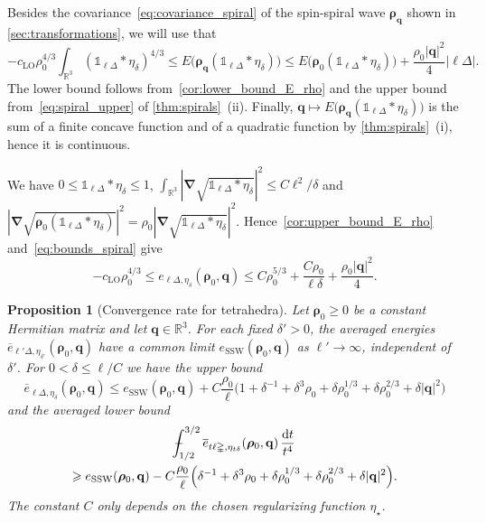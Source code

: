 \documentclass[final,reqno]{amsart}
\newtheorem{proposition}[theorem]{Proposition}
\theoremstyle{remark}
\renewcommand{\le}{\leqslant}
\renewcommand{\ge}{\geqslant}
\newcommand{\ol}[1]{\overline{#1}}
\newcommand{\RR}{\mathbb{R}}
\newcommand{\LO}{\mathrm{LO}}
\newcommand{\SSW}{\mathrm{SSW}}
\newcommand{\iden}{\mathbb{1}}
\newcommand{\grad}{\bm{\nabla}}
\newcommand{\tetra}{\mathbb{\Delta}}
\newcommand{\dd}{\mathrm{d}}
\def\Xint#1{\mathchoice
{\XXint\displaystyle\textstyle{#1}}
{\XXint\textstyle\scriptstyle{#1}}
{\XXint\scriptstyle\scriptscriptstyle{#1}}
{\XXint\scriptscriptstyle\scriptscriptstyle{#1}}
\!\int}
\def\XXint#1#2#3{{\setbox0=\hbox{$#1{#2#3}{\int}$ }
\vcenter{\hbox{$#2#3$ }}\kern-.6\wd0}}
\def\dashint{\Xint-}
\begin{document}
Besides the covariance~\cref{eq:covariance_spiral} of the spin-spiral wave $\bm{\rho}_{\mathbf{q}}$ shown in \cref{sec:transformations}, we will use that
\begin{equation}\label{eq:bounds_spiral}
-c_\LO\rho_0^{4/3}\int_{\RR^3}(\iden_{\ell\tetra}\ast\eta_\delta)^{4/3}\le E\big(\bm{\rho}_{\mathbf{q}}(\iden_{\ell\tetra}\ast\eta_\delta)\big)\le E\big(\bm{\rho}_0(\iden_{\ell\tetra}\ast\eta_\delta)\big)+\frac{\rho_0|\mathbf{q}|^2}{4}|\ell\tetra|.
\end{equation}
The lower bound follows from~\cref{cor:lower_bound_E_rho} and the upper bound from~\cref{eq:spiral_upper} of \cref{thm:spirals}~(ii). Finally, $\mathbf{q}\mapsto E\big(\bm{\rho}_{\mathbf{q}}(\iden_{\ell\tetra}\ast\eta_\delta)\big)$ is the sum of a finite concave function and of a quadratic function by \cref{thm:spirals}~(i), hence it is continuous.

We have $0\le\iden_{\ell\tetra}\ast\eta_\delta\le1$, $\int_{\RR^3}|\grad\sqrt{\iden_{\ell\tetra}\ast\eta_\delta}|^2\le C\ell^2/\delta$ and $|\grad\sqrt{\bm{\rho}_0(\iden_{\ell\tetra}\ast\eta_\delta)}|^2=\rho_0|\grad\sqrt{\iden_{\ell\tetra}\ast\eta_\delta}|^2$. Hence~\cref{cor:upper_bound_E_rho} and~\cref{eq:bounds_spiral} give
\begin{equation}\label{eq:bounds_tetrahedron_spiral}
-c_\LO\rho_0^{4/3}\le e_{\ell\tetra,\eta_\delta}(\bm{\rho}_0,\mathbf{q})\le C\rho_0^{5/3}+\frac{C\rho_0}{\ell\delta}+\frac{\rho_0|\mathbf{q}|^2}{4}.
\end{equation}

\begin{proposition}[Convergence rate for tetrahedra]\label{prop:rate_SSW}
Let $\bm{\rho}_0\ge0$ be a constant Hermitian matrix and let $\mathbf{q}\in\RR^3$. For each fixed $\delta'>0$, the averaged energies $\ol e_{\ell'\tetra,\eta_{\delta'}}(\bm{\rho}_0,\mathbf{q})$ have a common limit $e_\SSW(\bm{\rho}_0,\mathbf{q})$ as $\ell'\to\infty$, independent of $\delta'$. For $0<\delta\le\ell/C$ we have the upper bound
\begin{equation}\label{eq:rate_SSW_upper}
\ol{e}_{\ell\tetra,\eta_\delta}(\bm{\rho}_0,\mathbf{q})\le e_\SSW(\bm{\rho}_0,\mathbf{q})+C\frac{\rho_0}{\ell}\Big(1+\delta^{-1}+\delta^3\rho_0+\delta\rho_0^{1/3}+\delta\rho_0^{2/3}+\delta|\mathbf{q}|^2\Big)
\end{equation}
and the averaged lower bound
\begin{multline}\label{eq:rate_SSW_lower}
\dashint_{1/2}^{3/2}\ol{e}_{t\ell\tetra,\eta_{t\delta}}(\bm{\rho}_0,\mathbf{q})\,\frac{\dd t}{t^4}\\
\ge e_\SSW(\bm{\rho}_0,\mathbf{q})-C\frac{\rho_0}{\ell}\Big(\delta^{-1}+\delta^3\rho_0+\delta\rho_0^{1/3}+\delta\rho_0^{2/3}+\delta|\mathbf{q}|^2\Big).
\end{multline}
The constant $C$ only depends on the chosen regularizing function $\eta_\star$.
\end{proposition}
\end{document}
